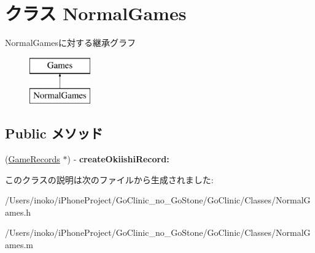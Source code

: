 \hypertarget{interface_normal_games}{
\section{クラス NormalGames}
\label{interface_normal_games}
}
NormalGamesに対する継承グラフ\begin{figure}[H]
\begin{center}
\leavevmode
\includegraphics[height=2.000000cm]{interface_normal_games}
\end{center}
\end{figure}
\subsection*{Public メソッド}
\begin{DoxyCompactItemize}
\item 
\hypertarget{interface_normal_games_ae9b9f04ad7e17ee10ed1c2271793188b}{
(\hyperlink{interface_game_records}{GameRecords} $\ast$) -\/ {\bfseries createOkiishiRecord:}}
\label{interface_normal_games_ae9b9f04ad7e17ee10ed1c2271793188b}

\end{DoxyCompactItemize}


このクラスの説明は次のファイルから生成されました:\begin{DoxyCompactItemize}
\item 
/Users/inoko/iPhoneProject/GoClinic\_\-no\_\-GoStone/GoClinic/Classes/NormalGames.h\item 
/Users/inoko/iPhoneProject/GoClinic\_\-no\_\-GoStone/GoClinic/Classes/NormalGames.m\end{DoxyCompactItemize}
